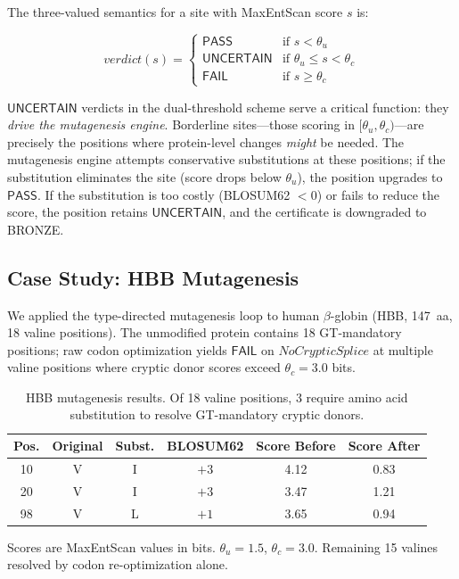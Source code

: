 \documentclass[runningheads]{llncs}
\newcommand{\PASS}{\ensuremath{\mathsf{PASS}}\xspace}
\newcommand{\FAIL}{\ensuremath{\mathsf{FAIL}}\xspace}
\newcommand{\UNCERTAIN}{\ensuremath{\mathsf{UNCERTAIN}}\xspace}
\begin{document}
The three-valued semantics for a site with MaxEntScan score $s$ is:

\begin{equation}\label{eq:dualthresh}
\mathit{verdict}(s) =
\begin{cases}
\PASS & \text{if } s < \theta_u \\
\UNCERTAIN & \text{if } \theta_u \le s < \theta_c \\
\FAIL & \text{if } s \ge \theta_c
\end{cases}
\end{equation}

\UNCERTAIN{} verdicts in the dual-threshold scheme serve a critical function: they \emph{drive the mutagenesis engine}.
Borderline sites---those scoring in $[\theta_u, \theta_c)$---are precisely the positions where protein-level changes \emph{might} be needed.
The mutagenesis engine attempts conservative substitutions at these positions; if the substitution eliminates the site (score drops below $\theta_u$), the position upgrades to \PASS.
If the substitution is too costly (BLOSUM62 $< 0$) or fails to reduce the score, the position retains \UNCERTAIN{}, and the certificate is downgraded to BRONZE.

\subsection{Case Study: HBB Mutagenesis}\label{sec:hbbmut}

We applied the type-directed mutagenesis loop to human $\beta$-globin (HBB, 147~aa, 18 valine positions).
The unmodified protein contains 18 GT-mandatory positions; raw codon optimization yields \FAIL{} on $\mathit{NoCrypticSplice}$ at multiple valine positions where cryptic donor scores exceed $\theta_c = 3.0$ bits.

\begin{table}[t]
\centering
\caption{HBB mutagenesis results. Of 18 valine positions, 3 require amino acid substitution to resolve GT-mandatory cryptic donors.}
\label{tab:hbbmut}
\begin{tabular}{cccccc}
\toprule
\textbf{Pos.} & \textbf{Original} & \textbf{Subst.} & \textbf{BLOSUM62} & \textbf{Score Before} & \textbf{Score After} \\
\midrule
10 & V & I & $+3$ & 4.12 & 0.83 \\
20 & V & I & $+3$ & 3.47 & 1.21 \\
98 & V & L & $+1$ & 3.65 & 0.94 \\
\bottomrule
\end{tabular}
\vspace{2pt}

{\scriptsize Scores are MaxEntScan values in bits. $\theta_u = 1.5$, $\theta_c = 3.0$. Remaining 15 valines resolved by codon re-optimization alone.}
\end{table}
\end{document}
